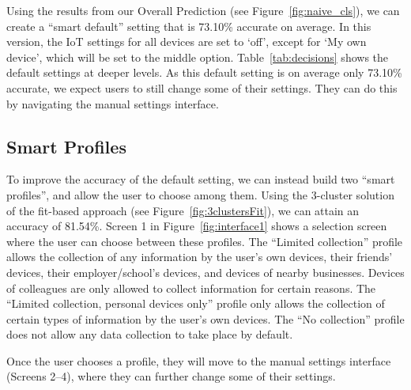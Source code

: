 Using the results from our Overall Prediction (see Figure~\ref{fig:naive_cls}), we can create a ``smart default'' setting that is 73.10\% accurate on average. In this version, the IoT settings for all devices are set to `off', except for `My own device', which will be set to the middle option. Table~\ref{tab:decisions} shows the default settings at deeper levels.
As this default setting is on average only 73.10\% accurate, we expect users to still change some of their settings. They can do this by navigating the manual settings interface.

\subsection{Smart Profiles}
To improve the accuracy of the default setting, we can instead build two ``smart profiles'', and allow the user to choose among them. Using the 3-cluster solution of the fit-based approach (see Figure~\ref{fig:3clustersFit}), we can attain an accuracy of 81.54\%. Screen 1 in Figure~\ref{fig:interface1} shows a selection screen where the user can choose between these profiles. The ``Limited collection'' profile allows the collection of any information by the user's own devices, their friends' devices, their employer/school's devices, and devices of nearby businesses. Devices of colleagues are only allowed to collect information for certain reasons. The ``Limited collection, personal devices only'' profile only allows the collection of certain types of information by the user's own devices. The ``No collection'' profile does not allow any data collection to take place by default.

Once the user chooses a profile, they will move to the manual settings interface (Screens 2--4), where they can further change some of their settings.

